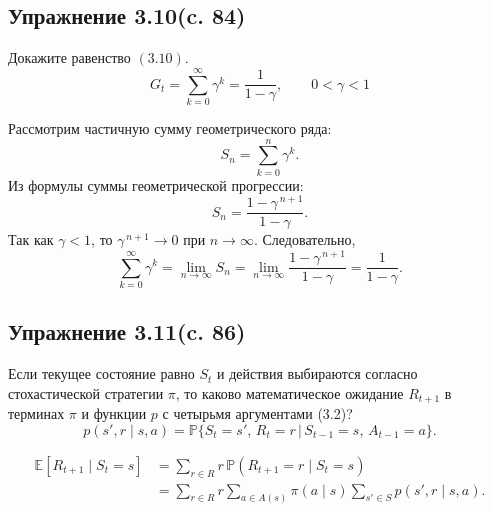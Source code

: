 \subsection{Упражнение 3.10(c. 84)}
Докажите равенство $(3.10)$.
\begin{equation}
G_t = \sum_{k=0}^{\infty} \gamma^k = \frac{1}{1 - \gamma}, \qquad 0 < \gamma < 1
\tag{3.10}
\end{equation}
\begin{solution}
    Рассмотрим частичную сумму геометрического ряда:
    \[
    S_n=\sum_{k=0}^{n}\gamma^k.
    \]
    Из формулы суммы геометрической прогрессии:
    \[
    S_n=\frac{1-\gamma^{\,n+1}}{1-\gamma}.
    \]
    Так как $\gamma<1$, то $\gamma^{\,n+1}\to 0$ при $n\to\infty$. Следовательно,
    \[
    \sum_{k=0}^{\infty}\gamma^k
    =\lim_{n\to\infty} S_n
    =\lim_{n\to\infty}\frac{1-\gamma^{\,n+1}}{1-\gamma}
    =\frac{1}{1-\gamma}.
    \]
\end{solution}

\subsection{Упражнение 3.11(c. 86)}
Если текущее состояние равно $S_t$ и действия выбираются согласно стохастической стратегии $\pi$, то каково математическое ожидание $R_{t+1}$
в терминах $\pi$ и функции $p$ с четырьмя аргументами (3.2)?
\begin{equation}
p(s', r \mid s, a)
=
\mathbb{P}\!\bigl\{ S_t = s',\, R_t = r \,\big|\, S_{t-1} = s,\, A_{t-1} = a \bigr\}.
\tag{3.2}
\end{equation}
\begin{solution}
    \[
    \begin{aligned}
    \mathbb{E}\!\left[R_{t+1}\mid S_t=s\right]
    &= \sum_{r\in R} r\,\mathbb{P}\!\left(R_{t+1}=r\mid S_t=s\right) \\
    &= \sum_{r\in R} r \sum_{a\in A(s)} \pi(a\mid s)
    \sum_{s'\in S} p(s',r \mid s,a).
    \end{aligned}
    \]
\end{solution}

